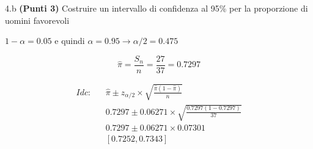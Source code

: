 \documentclass[
  11pt,
]{book}
\theoremstyle{mytheoremstyle}
\theoremstyle{mydefstyle}
\newenvironment{sol}
  {
  \begin{tcolorbox}[enhanced,breakable,arc=0.1mm,boxrule=1pt,colback=white,colframe=iblue,
  title=\bf \fontfamily{lmss}\selectfont \hspace{.5 cm} Soluzione,drop fuzzy shadow]

}{
\end{tcolorbox}
  }
\begin{document}
4.b \textbf{(Punti 3)} Costruire un intervallo di confidenza al 95\% per la proporzione di uomini
favorevoli

\begin{sol}
\(1-\alpha =0.05\) e quindi \(\alpha=0.95\rightarrow \alpha/2=0.475\)

\[
  \hat\pi = \frac{S_n}n = \frac{ 27 }{ 37 }= 0.7297 
\]

\begin{eqnarray*}
  Idc: & &  \hat\pi \pm  z_{\alpha/2} \times \sqrt{\frac{\hat\pi(1-\hat\pi)}{n}} \\
     & &  0.7297 \pm  0.06271 \times \sqrt{\frac{ 0.7297 (1- 0.7297 )}{ 37 }} \\
     & &  0.7297 \pm  0.06271 \times  0.07301 \\
     & & [ 0.7252 ,  0.7343 ]
\end{eqnarray*}

\end{sol}
\end{document}
